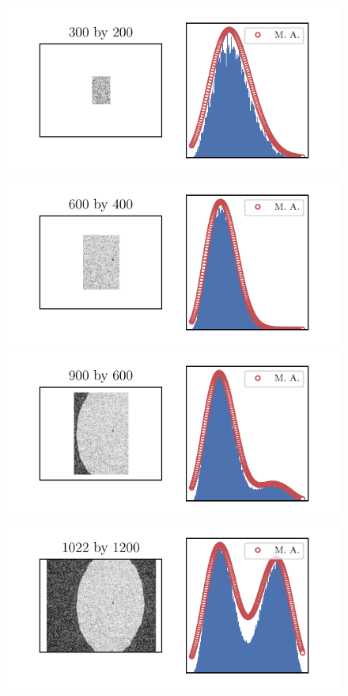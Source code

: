 \documentclass[12pt, twoside, a4paper]{article}
\begin{document}
\begin{figure}[!htbp]
	\centering
	\includegraphics[scale=1.0]{figures/07_ModalAnalysisBigDomain/ModalAnalysis_xROI = 300 yROI = 200.pdf} \\
	\includegraphics[scale=1.0]{figures/07_ModalAnalysisBigDomain/ModalAnalysis_xROI = 600 yROI = 400.pdf} \\
	\includegraphics[scale=1.0]{figures/07_ModalAnalysisBigDomain/ModalAnalysis_xROI = 900 yROI = 600.pdf} \\
	\includegraphics[scale=1.0]{figures/07_ModalAnalysisBigDomain/ModalAnalysis_xROI = 1022 yROI = 1200.pdf} \\

\end{figure}
\end{document}
